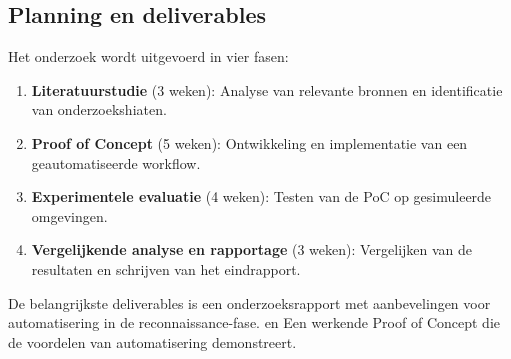 \subsection{Planning en deliverables}
Het onderzoek wordt uitgevoerd in vier fasen:
\begin{enumerate}
    \item \textbf{Literatuurstudie} (3 weken): Analyse van relevante bronnen en identificatie van onderzoekshiaten.
    \item \textbf{Proof of Concept} (5 weken): Ontwikkeling en implementatie van een geautomatiseerde workflow.
    \item \textbf{Experimentele evaluatie} (4 weken): Testen van de PoC op gesimuleerde omgevingen.
    \item \textbf{Vergelijkende analyse en rapportage} (3 weken): Vergelijken van de resultaten en schrijven van het eindrapport.
\end{enumerate}



De belangrijkste deliverables is een onderzoeksrapport met aanbevelingen voor automatisering in de reconnaissance-fase.
en Een werkende Proof of Concept die de voordelen van automatisering demonstreert.









